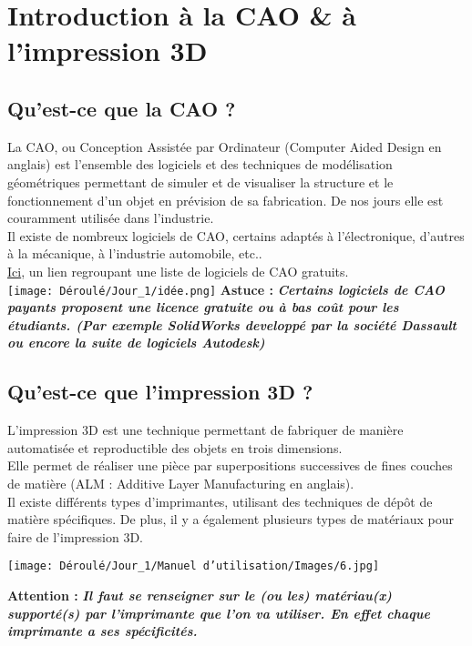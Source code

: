 \section{Introduction à la CAO \& à l'impression 3D}

\subsection{Qu'est-ce que la CAO ?}

\begin{flushleft}
    La CAO, ou Conception Assistée par Ordinateur (Computer Aided Design en anglais) est l'ensemble des logiciels et des techniques de modélisation géométriques permettant de simuler et de visualiser la structure et le fonctionnement d'un objet en prévision de sa fabrication. De nos jours elle est couramment utilisée dans l'industrie.\\
    Il existe de nombreux logiciels de CAO, certains adaptés à l'électronique, d'autres à la mécanique, à l'industrie automobile, etc..\\ \href{https://all3dp.com/1/best-free-3d-modeling-software-for-beginners/}{Ici}, un lien regroupant une liste de logiciels de CAO gratuits.\\\vspace{0.2cm}
    \texttt{[image: Déroulé/Jour\_1/idée.png]}
    \textbf{\large Astuce : }\textbf{\textit{\large Certains logiciels de CAO payants proposent une licence gratuite ou à bas coût pour les étudiants. (Par exemple SolidWorks developpé par la société Dassault ou encore la suite de logiciels Autodesk)}}

\subsection{Qu'est-ce que l'impression 3D ?}

     L'impression 3D est une technique permettant de fabriquer de manière automatisée et reproductible des objets en trois dimensions.\\
     Elle permet de réaliser une pièce par superpositions successives de fines couches de matière (ALM : Additive Layer Manufacturing en anglais).\\
     Il existe différents types d'imprimantes, utilisant des techniques de dépôt de matière spécifiques. De plus, il y a également plusieurs types de matériaux pour faire de l'impression 3D.\vspace{0.2cm}
     
     \begin{multicols}{2}
     \texttt{[image: Déroulé/Jour\_1/Manuel d'utilisation/Images/6.jpg]}
     
     \columnbreak
     
     \textbf{Attention : }\textbf{\textit{Il faut se renseigner sur le (ou les) matériau(x) supporté(s) par l'imprimante que l'on va utiliser. En effet chaque imprimante a ses spécificités.}}
     \end{multicols}
\end{flushleft}

